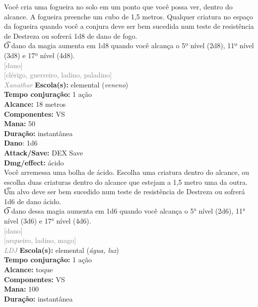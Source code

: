 \documentclass{RPG_Adventure}[2021/10/20]
\begin{document}
{\normalsize Você cria uma fogueira no solo em um ponto que você possa ver, dentro do alcance. A fogueira preenche um cubo de 1,5 metros. Qualquer criatura no espaço da fogueira quando você a conjura deve ser bem sucedida num teste de resistência de Destreza ou sofrerá 1d8 de dano de fogo.\\\t O dano da magia aumenta em 1d8 quando você alcança o 5º nível (2d8), 11º nível (3d8) e 17º nível (4d8).\\}
{\scriptsize \textcolor{gray}{[dano]\\}}
{\scriptsize \textcolor{gray}{[clérigo, guerreiro, ladino, paladino]\\}}
{\tiny \textcolor{gray}{\textit{Xanathar}}}
{\small \t \textbf{Escola(s):} elemental (\textit{veneno})\\\t \textbf{Tempo conjuração:} 1 ação\\\t \textbf{Alcance:} 18 metros\\\t \textbf{Componentes:} VS\\\t \textbf{Mana:} 50\\\t \textbf{Duração:} instantânea\\\t \textbf{Dano}: 1d6\\\t \textbf{Attack/Save:} DEX Save\\\t \textbf{Dmg/effect:} ácido\\}
{\normalsize Você arremessa uma bolha de ácido. Escolha uma criatura dentro do alcance, ou escolha duas criaturas dentro do alcance que estejam a 1,5 metro uma da outra.\\\t Um alvo deve ser bem sucedido num teste de resistência de Destreza ou sofrerá 1d6 de dano ácido.\\\t O dano dessa magia aumenta em 1d6 quando você alcança o 5° nível (2d6), 11° nível (3d6) e 17° nível (4d6).\\}
{\scriptsize \textcolor{gray}{[dano]\\}}
{\scriptsize \textcolor{gray}{[arqueiro, ladino, mago]\\}}
{\tiny \textcolor{gray}{\textit{LDJ}}}
{\small \t \textbf{Escola(s):} elemental (\textit{água, luz})\\\t \textbf{Tempo conjuração:} 1 ação\\\t \textbf{Alcance:} toque\\\t \textbf{Componentes:} VS\\\t \textbf{Mana:} 100\\\t \textbf{Duração:} instantânea\\}
\end{document}
